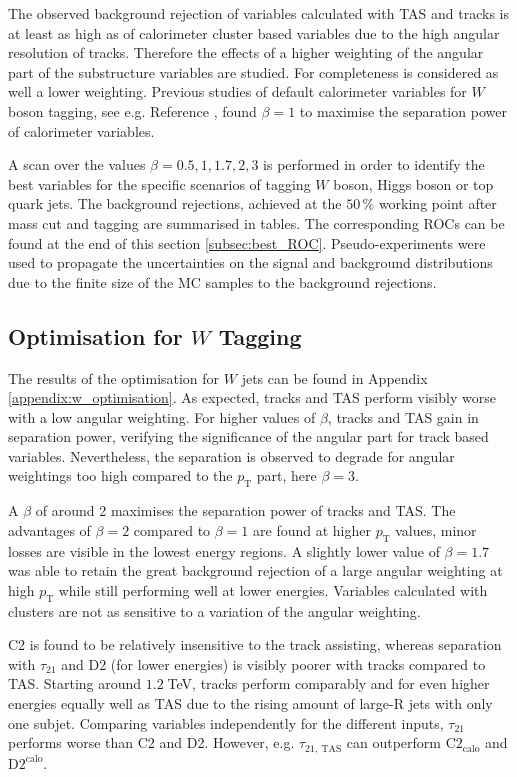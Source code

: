 The observed background rejection of variables calculated with TAS and tracks is at least as high as of calorimeter cluster based variables due to the high angular resolution of tracks. Therefore the effects of a higher weighting of the angular part of the substructure variables are studied.  For completeness is considered as well a lower weighting. Previous studies of default calorimeter variables for $W$ boson tagging, see e.g. Reference \cite{bib:w_tagging}, found $\beta=1$ to maximise the separation power of calorimeter variables.

A scan over the values $\beta= 0.5, 1, 1.7, 2, 3$ is performed in order to identify the best variables for the specific scenarios of tagging $W$ boson, Higgs boson or top quark jets. The background rejections, achieved at the $50\,\%$ working point after mass cut and tagging are summarised in tables. The corresponding ROCs can be found at the end of this section \ref{subsec:best_ROC}. Pseudo-experiments were used to propagate the uncertainties on the signal and background distributions due to the finite size of the MC samples to the background rejections. 

\subsection{Optimisation for $W$ Tagging}\label{sec:wopt}
The results of the optimisation for $W$ jets can be found in Appendix \ref{appendix:w_optimisation}. As expected, tracks and TAS perform visibly worse with a low angular weighting. For higher values of $\beta$, tracks and TAS gain in separation power, verifying the significance of the angular part for track based variables. Nevertheless, the separation is observed to degrade for angular weightings too high compared to the $p_{\mathrm{T}}$ part, here $\beta=3$.

A $\beta$ of around 2 maximises the separation power of tracks and TAS. The advantages of $\beta=2$ compared to $\beta=1$ are found at higher $p_{\mathrm{T}}$ values, minor losses are visible in the lowest energy regions. A slightly lower value of $\beta=1.7$ was able to retain the great background rejection of a large angular weighting at high $p_{\mathrm{T}}$ while still performing well at lower energies. Variables calculated with clusters are not as sensitive to a variation of the angular weighting.

C2 is found to be relatively insensitive to the track assisting, whereas separation with $\tau_{21}$ and D2 (for lower energies) is visibly poorer with tracks compared to TAS.  Starting around $1.2\;$TeV, tracks perform comparably and for even higher energies equally well as TAS due to the rising amount of large-R jets with only one subjet. Comparing variables independently for the different inputs, $\tau_{21}$ performs worse than C2 and D2. However, e.g. $\tau_{21,\: \text{TAS}}$ can outperform $\text{C2}_{\text{calo}}$ and $\text{D2}^{\text{calo}}$.

